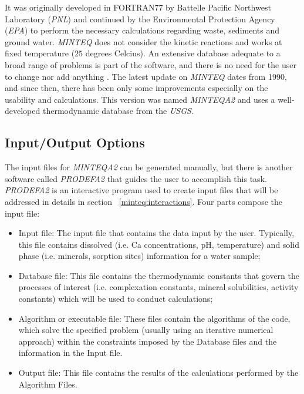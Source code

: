 It was originally developed in FORTRAN77 by Battelle Pacific Northwest Laboratory (\emph{PNL}) and continued by the Environmental Protection Agency (\emph{EPA}) to perform the  necessary calculations regarding waste, sediments and ground water. \emph{MINTEQ} does not consider the kinetic reactions and works at fixed temperature ($25$ degrees Celcius). 
An extensive database adequate to a broad range of problems is part of the software, and there is no need for the user to change nor add anything \cite{Brown:87} \cite{Allison:91}. The latest update on \emph{MINTEQ} dates from 1990, and since then, there has been only some improvements especially on the usability and calculations. This version was named \emph{MINTEQA2} and uses a well-developed thermodynamic database from the \emph{USGS}.

\subsection{Input/Output Options}
The input files for \emph{MINTEQA2} can be generated manually, but there is another software called \emph{PRODEFA2} that guides the user to accomplish this task. \emph{PRODEFA2} is an interactive program used to create input files that will be addressed in details in section ~\ref{minteq:interactions}. Four parts compose the input file:
\begin{itemize}
\item Input file: The input file that contains the data input by the user. Typically, this file contains dissolved (i.e. Ca concentrations, pH, temperature) and solid phase (i.e. minerals, sorption sites) information for a water sample;
\item Database file: This file contains the thermodynamic constants that govern the processes of interest (i.e. complexation constants, mineral solubilities, activity constants) which will be used to conduct calculations;
\item Algorithm or executable file:  These files contain the algorithms of the code, which solve the specified problem (usually using an iterative numerical approach) within the constraints imposed by the Database files and the information in the Input file.
\item Output file: This file contains the results of the calculations performed by the Algorithm Files.
\end{itemize}

